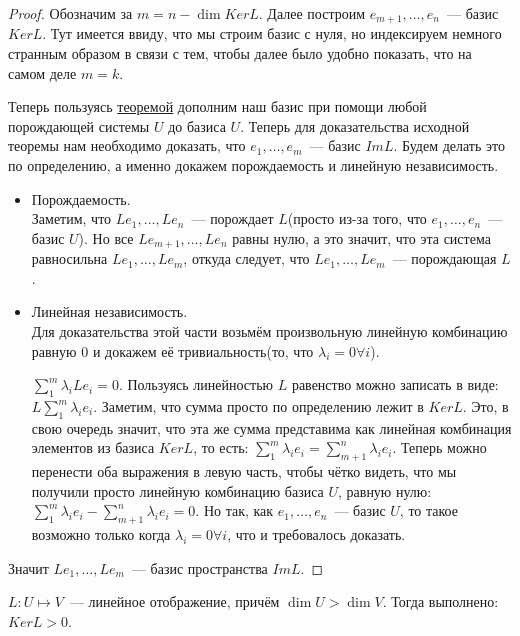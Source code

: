 \begin{proof}
    Обозначим за $m=n - \dim Ker L$.
    Далее построим $e_{m+1},\dots, e_n$~--- базис $Ker L$.
    Тут имеется ввиду, что мы строим базис с нуля, но индексируем немного странным
    образом в связи с тем, чтобы далее было удобно показать, что на самом деле $m = k$.

    Теперь пользуясь \hyperref[thm:О дополнении до базиса]{теоремой} дополним наш базис
    при помощи любой порождающей системы $U$ до базиса $U$. Теперь для доказательства
    исходной теоремы нам необходимо доказать, что $e_1,\dots, e_m$~--- базис $Im L$.
    Будем делать это по определению, а именно докажем порождаемость и линейную независимость.

    \begin{itemize}
        \item Порождаемость.\\
            Заметим, что $Le_1,\dots,Le_n$~--- порождает $L$(просто из-за того, что $e_1,\dots,e_n$~--- базис $U$).
            Но все $Le_{m+1}, \dots, Le_n$ равны нулю, а это значит, что эта система равносильна
            $Le_1,\dots,Le_m$, откуда следует, что $Le_1,\dots, Le_m$~--- порождающая $L$.
        \item Линейная независимость.\\
            Для доказательства этой части возьмём произвольную линейную комбинацию равную 0 и докажем её 
            тривиальность(то, что $\lambda_i = 0 \forall i$).

            $\sum\limits_{1}^{m}{\lambda_i Le_i} = 0$. Пользуясь линейностью $L$ равенство можно записать
            в виде: $L\sum\limits_{1}^{m}{\lambda_ie_i}$. Заметим, что сумма просто по определению
            лежит в $Ker L$. Это, в свою очередь значит, что эта же сумма представима как линейная
            комбинация элементов из базиса $Ker L$, то есть:  
            $\sum\limits_{1}^{m}{\lambda_ie_i} = \sum\limits_{m+1}^{n}{\lambda_ie_i}$. 
            Теперь можно перенести оба выражения в левую часть, чтобы чётко видеть, что мы получили
            просто линейную комбинацию базиса $U$, равную нулю: 
            $\sum\limits_{1}^{m}{\lambda_ie_i} - \sum\limits_{m+1}^{n}{\lambda_ie_i} = 0$. 
            Но так, как $e_1,\dots, e_n$~--- базис $U$, то такое возможно только когда
            $\lambda_i = 0\forall i$, что и требовалось доказать.
    \end{itemize}
    Значит $Le_1,\dots,Le_m$~--- базис пространства $Im L$.
\end{proof}
\begin{follow}
    $L: U\mapsto V$~--- линейное отображение, причём $\dim U > \dim V$.
    Тогда выполнено:  $Ker L > 0$.\\
\end{follow}
